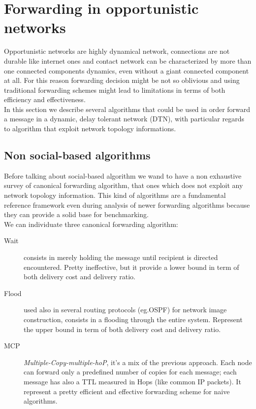 \section{Forwarding in opportunistic networks}
\label{forwarding}

Opportunistic networks are highly dynamical network, connections are not durable like internet ones and contact network can be characterized by more than one connected components dynamics, even without a giant connected component at all. For this reason forwarding decision might be not so oblivious and using traditional forwarding schemes might lead to limitations in terms of both efficiency and effectiveness. \\
In this section we describe several algorithms that could be used in order forward a message in a dynamic, delay tolerant network (DTN), with particular regards to algorithm that exploit network topology informations.

\subsection{Non social-based algorithms}
\label{f_non_social}
Before talking about social-based algorithm we wand to have a non exhaustive survey of canonical forwarding algorithm, that ones which does not exploit any network topology information. This kind of algorithms are a fundamental reference framework even during analysis of newer forwarding algorithms because they can provide a solid base for benchmarking. \\
We can individuate three canonical forwarding algorithm:

\begin{description}
\item[Wait] consists in merely holding the message until recipient is directed encountered. Pretty ineffective, but it provide a lower bound in term of both delivery cost and delivery ratio.
\item[Flood] used also in several routing protocols (eg.OSPF) for network image construction, consists in a flooding through the entire system. Represent the upper bound in term of both delivery cost and delivery ratio.
\item[MCP] \emph{Multiple-Copy-multiple-hoP}, it's a mix of the previous approach. Each node can forward only a predefined number of copies for each message; each message has also a TTL measured in Hops (like common IP packets). It represent a pretty efficient and effective forwarding scheme for naive algorithms.\end{description} 

